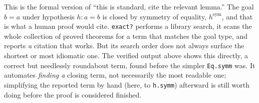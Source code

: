 \begin{mathreading}

This is the formal version of ``this is standard, cite the relevant lemma.'' The goal \(b = a\) under hypothesis \(h : a = b\) is closed by symmetry of equality, \(h^{\mathrm{sym}}\), and that is what a human proof would cite. \texttt{exact?} performs a library search, it scans the whole collection of proved theorems for a term that matches the goal type, and reports \emph{a} citation that works. But its search order does not always surface the shortest or most idiomatic one. The verified output above shows this directly, a correct but needlessly roundabout term, found before the simpler \texttt{Eq.symm} was. It automates \emph{finding a} closing term, not necessarily the most readable one; simplifying the reported term by hand (here, to \texttt{h.symm}) afterward is still worth doing before the proof is considered finished.

\end{mathreading}

